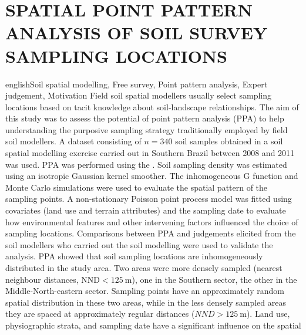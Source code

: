 \artigotrue
\chapter{SPATIAL POINT PATTERN ANALYSIS OF SOIL SURVEY SAMPLING LOCATIONS}
\label{chap:chap07}



\def\enkeys{Soil spatial modelling, Free survey, Point pattern analysis, Expert judgement, Motivation}
  
\begin{chapterabstract}{english}{\enkeys}
Field soil spatial modellers usually select sampling locations based on tacit knowledge about soil-landscape 
relationships. The aim of this study was to assess the potential of point pattern analysis (PPA) to help 
understanding the purposive sampling strategy traditionally employed by field soil modellers. A dataset 
consisting of $n = 340$ soil samples obtained in a soil spatial modelling exercise carried out in Southern 
Brazil between \num{2008} and \num{2011} was used. PPA was performed using the 
. Soil sampling density was estimated using an isotropic Gaussian kernel smoother. The 
inhomogeneous G function and Monte Carlo simulations were used to evaluate the spatial pattern of the sampling 
points. A non-stationary Poisson point process model was fitted using covariates (land use and terrain 
attributes) and the sampling date to evaluate how environmental features and other intervening factors 
influenced the choice of sampling locations. Comparisons between PPA and judgements elicited from the 
soil modellers who carried out the soil modelling were used to validate the analysis. PPA showed that soil 
sampling locations are inhomogeneously distributed in the study area. Two areas were more densely sampled 
(nearest neighbour distances, $\text{NND} < \SI{125}{\m}$), one in the Southern sector, the other in the 
Middle-North-eastern sector. Sampling points have an approximately random spatial distribution in these two 
areas, while in the less densely sampled areas they are spaced at approximately regular distances ($NND 
> \SI{125}{\m}$). Land use, physiographic strata, and sampling date have a significant influence on the spatial

\end{chapterabstract}
